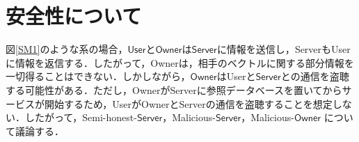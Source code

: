 \documentclass[a4paper]{jsarticle}
\newcommand{\user}{\textsf{User}}
\newcommand{\server}{\textsf{Server}}
\newcommand{\owner}{\textsf{Owner}}
\begin{document}
\section{安全性について}


図\ref{SM1}のような系の場合，$\mathsf{User}$と$\mathsf{Owner}$は$\mathsf{Server}$に情報を送信し，\server も\user に情報を返信する．したがって，\owner は，相手のベクトルに関する部分情報を一切得ることはできない．しかしながら，$\mathsf{Owner}$は\user と$\mathsf{Server}$との通信を盗聴する可能性がある．ただし，\owner が\server に参照データベースを置いてからサービスが開始するため，\user が\owner と\server の通信を盗聴することを想定しない．したがって，Semi-honest-$\mathsf{Server}$，Malicious-$\mathsf{Server}$，Malicious-$\mathsf{Owner}$ について議論する．
\end{document}
